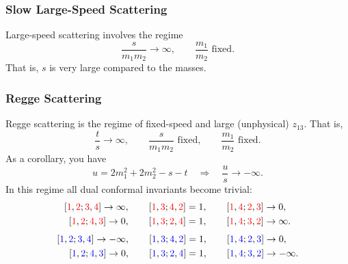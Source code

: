 \subsubsection{Slow Large-Speed Scattering}
Large-speed scattering involves the regime
\begin{equation}
	\frac{s}{m_{1} m_{2}} \rightarrow \infty, \qquad \frac{m_{1}}{m_{2}} \text{ fixed}.
\end{equation}
That is, $s$ is very large compared to the masses.
\subsubsection{Regge Scattering}
Regge scattering is the regime of fixed-speed and large (unphysical) $z_{13}$. That is,
\begin{equation}
	\frac{t}{s} \rightarrow \infty, \qquad \frac{s}{m_{1} m_{2}} \text{ fixed}, \qquad \frac{m_{1}}{m_{2}} \text{ fixed}.
\end{equation}
As a corollary, you have
\begin{equation}
	u = 2m_{1}^{2} + 2m_{2}^{2} - s - t \quad \Longrightarrow \quad \frac{u}{s} \rightarrow -\infty.
\end{equation}
In this regime all dual conformal invariants become trivial:
\begin{equation}
\begin{split}
	\left[ {\color{red} 1} , {\color{red} 2} ; {\color{red} 3} , {\color{red} 4} \right] \rightarrow \infty, \qquad
	\left[ {\color{red} 1} , {\color{red} 3} ; {\color{red} 4} , {\color{red} 2} \right] &= 1, \qquad
	\left[ {\color{red} 1} , {\color{red} 4} ; {\color{red} 2} , {\color{red} 3} \right] \rightarrow 0, \\
	\left[ {\color{red} 1} , {\color{red} 2} ; {\color{red} 4} , {\color{red} 3} \right] \rightarrow 0, \qquad
	\left[ {\color{red} 1} , {\color{red} 3} ; {\color{red} 2} , {\color{red} 4} \right] &= 1, \qquad
	\left[ {\color{red} 1} , {\color{red} 4} ; {\color{red} 3} , {\color{red} 2} \right] \rightarrow \infty.
\end{split}
\end{equation}
\begin{equation}
\begin{split}
	\left[ {\color{blue} 1} , {\color{blue} 2} ; {\color{blue} 3} , {\color{blue} 4} \right] \rightarrow -\infty, \qquad
	\left[ {\color{blue} 1} , {\color{blue} 3} ; {\color{blue} 4} , {\color{blue} 2} \right] &= 1, \qquad
	\left[ {\color{blue} 1} , {\color{blue} 4} ; {\color{blue} 2} , {\color{blue} 3} \right] \rightarrow 0, \\
	\left[ {\color{blue} 1} , {\color{blue} 2} ; {\color{blue} 4} , {\color{blue} 3} \right] \rightarrow 0, \qquad
	\left[ {\color{blue} 1} , {\color{blue} 3} ; {\color{blue} 2} , {\color{blue} 4} \right] &= 1, \qquad
	\left[ {\color{blue} 1} , {\color{blue} 4} ; {\color{blue} 3} , {\color{blue} 2} \right] \rightarrow -\infty.
\end{split}
\end{equation}
